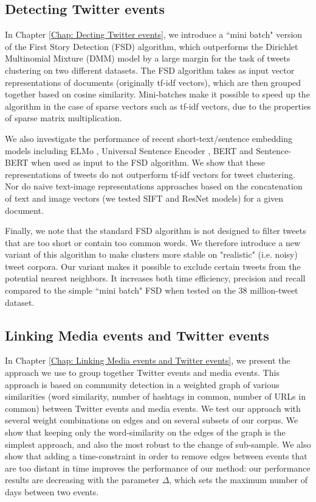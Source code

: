 \subsection{Detecting Twitter events}
In Chapter \ref{Chap: Decting Twitter events}, we introduce a ``mini batch" version of the First Story Detection (FSD) \citep{allan_introduction_2002} algorithm, which outperforms the Dirichlet Multinomial Mixture (DMM) model \citep{yin_dirichlet_2014} by a large margin for the task of tweets clustering on two different datasets. The FSD algorithm takes as input vector representations of documents (originally tf-idf vectors), which are then grouped together based on cosine similarity. Mini-batches make it possible to speed up the algorithm in the case of sparse vectors such as tf-idf vectors, due to the properties of sparse matrix multiplication. 

We also investigate the performance of recent short-text/sentence embedding models including ELMo \citep{peters2018deep}, Universal Sentence Encoder \citep{cer2018universal}, BERT \citep{devlin2018bert} and Sentence-BERT \citep{reimers_2019_sentence} when used as input to the FSD algorithm. We show that these representations of tweets do not outperform tf-idf vectors for tweet clustering. Nor do naive text-image representations approaches based on the concatenation of text and image vectors (we tested SIFT \citep{lowe1999object} and ResNet \citep{he2016deep} models) for a given document.

Finally, we note that the standard FSD algorithm is not designed to filter tweets that are too short or contain too common words. We therefore introduce a new variant of this algorithm to make clusters more stable on "realistic" (i.e. noisy) tweet corpora. Our variant makes it possible to exclude certain tweets from the potential nearest neighbors. It increases both time efficiency, precision and recall compared to the simple ``mini batch" FSD when tested on the 38 million-tweet dataset.

\subsection{Linking Media events and Twitter events}

In Chapter \ref{Chap: Linking Media events and Twitter events}, we present the approach we use to group together Twitter events and media events. This approach is based on community detection in a weighted graph of various similarities (word similarity, number of hashtags in common, number of URLs in common) between Twitter events and media events. We test our approach with several weight combinations on edges and on several subsets of our corpus. We show that keeping only the word-similarity on the edges of the graph is the simplest approach, and also the most robust to the change of sub-sample. We also show that adding a time-constraint in order to remove edges between events that are too distant in time improves the performance of our method: our performance results are decreasing with the parameter $\Delta$, which sets the maximum number of days between two events.

